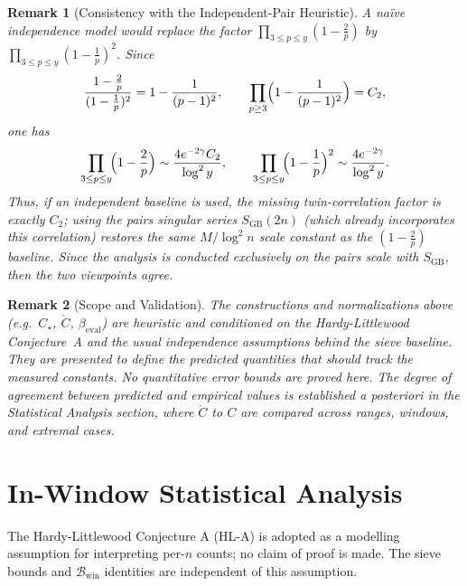 \documentclass[11pt]{article}
\theoremstyle{inline}
\newtheorem*{remark}{Remark}
\theoremstyle{break}
\theoremstyle{break}
\theoremstyle{break}
\theoremstyle{break}
\theoremstyle{break}
\theoremstyle{break}
\theoremstyle{break}
\theoremstyle{inline}
\newcommand{\twin}{{\scriptscriptstyle\mathrm{win}}}
\newcommand{\Cmeas}{C}              %
\newcommand{\Cpred}{\mathring{C}}   %
\newcommand{\Bwin}{\mathcal{B}_\twin}
\newcommand{\betacal}{\beta_{\mathrm{eval}}}
\begin{document}
\begin{remark}[Consistency with the Independent-Pair Heuristic]
A naïve independence model would replace the factor
\(\prod_{3\le p\le y}(1-\tfrac{2}{p})\) by \(\prod_{3\le p\le y}(1-\tfrac{1}{p})^2\).
Since
\begin{equation}
\frac{1-\tfrac{2}{p}}{(1-\tfrac{1}{p})^2}=1-\frac{1}{(p-1)^2},
\qquad
\prod_{p\ge3}\Bigl(1-\frac{1}{(p-1)^2}\Bigr)=C_2,
\end{equation}
one has \cite{HardyLittlewood1923, MontgomeryVaughan2007}
\begin{equation}
\prod_{3\le p\le y}\!\Bigl(1-\frac{2}{p}\Bigr)
\sim \frac{4e^{-2\gamma}C_2}{\log^2 y},
\qquad
\prod_{3\le p\le y}\!\Bigl(1-\frac{1}{p}\Bigr)^2
\sim \frac{4e^{-2\gamma}}{\log^2 y}.
\end{equation}
Thus, if an independent baseline is used, the missing twin-correlation factor
is exactly \(C_2\); using the pairs singular series \(S_{\mathrm{GB}}(2n)\) (which
already incorporates this correlation) restores the same \(M/\log^2 n\) scale
constant as the \( (1-\tfrac{2}{p}) \) baseline. Since the analysis is conducted exclusively on the
pairs scale with \(S_{\mathrm{GB}}\), then the two viewpoints agree.
\end{remark}

\begin{remark}[Scope and Validation]
The constructions and normalizations above (e.g.\ \( C_\star \), \( \Cpred \), \( \betacal \))
are heuristic and conditioned on the Hardy-Littlewood Conjecture~A and the usual
independence assumptions behind the sieve baseline. They are presented to define
the \emph{predicted} quantities that should track the \emph{measured} constants.
No quantitative error bounds are proved here. The degree of agreement between
predicted and empirical values is established \emph{a posteriori} in the
Statistical Analysis section, where \( \Cpred \) to \( \Cmeas \) are compared across ranges,
windows, and extremal cases.
\end{remark}


\section{In-Window Statistical Analysis}\label{sec:stats}

The Hardy-Littlewood Conjecture A (HL-A) is adopted as a modelling assumption for interpreting per-\( n \) counts; no claim of proof is made. The sieve bounds and \( \Bwin \) identities are independent of this assumption.
\end{document}
